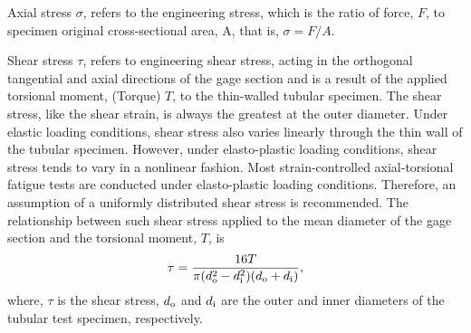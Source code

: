 Axial stress $\sigma$, refers to the engineering stress, which is the ratio of force, $F$, to specimen original cross-sectional area, A, that is, $\sigma=F/A$.

Shear stress $\tau$, refers to engineering shear stress, acting in the orthogonal tangential and axial directions of the gage section and is a result of the applied torsional moment, (Torque) $T$, to the thin-walled tubular specimen. The shear stress, like the shear strain, is always the greatest at the outer diameter. Under elastic loading conditions, shear stress also varies linearly through the thin wall of the tubular specimen. However, under elasto-plastic loading conditions, shear stress tends to vary in a nonlinear fashion. Most strain-controlled axial-torsional fatigue tests are conducted under elasto-plastic loading conditions. Therefore, an assumption of a uniformly distributed shear stress is recommended. The relationship between such shear stress applied to the mean diameter of the gage section and the torsional moment, $T$, is
\begin{equation}
\tau=\frac{16T}{\pi(d_{\rm{o}}^2-d_{\rm{i}}^2)(d_{\rm{o}}+d_{\rm{i}})},
\label{Equ:shear_stress}
\end{equation}
where, $\tau$ is the shear stress, $d_{\rm{o}}$ and $d_{\rm{i}}$ are the outer and inner diameters of the tubular test specimen, respectively.

